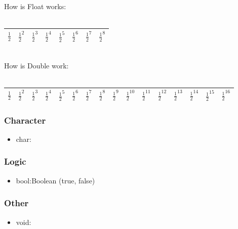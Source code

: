 \documentclass[a4paper]{article}
\begin{document}
\begin{remark}
How is Float works:\\
\\
\begin{tabular}{|c|c|c|c|c|c|c|c|}
\hline
 $\frac{1}{2}$&$ \frac{1}{2}^2$&$\frac{1}{2}^3 $&$\frac{1}{2}^4 $&$ \frac{1}{2}^5 $&$\frac{1}{2}^6 $&$\frac{1}{2}^7 $&$\frac{1}{2}^8$\\
\hline
\end{tabular}
\\
How is Double work:\\
\\
\begin{tabular}{|c|c|c|c|c|c|c|c|c|c|c|c|c|c|c|c|}
\hline
 $\frac{1}{2}$&$ \frac{1}{2}^2$&$\frac{1}{2}^3 $&$\frac{1}{2}^4 $&$ \frac{1}{2}^5 $&$\frac{1}{2}^6 $&$\frac{1}{2}^7 $&$\frac{1}{2}^8$&$\frac{1}{2}^9$&$ \frac{1}{2}^{10}$&$\frac{1}{2}^{11} $&$\frac{1}{2}^{12}$ & $\frac{1}{2}^{13}$ &$\frac{1}{2}^{14} $&$\frac{1}{2}^{15} $&$\frac{1}{2}^{16}$\\
\hline
\end{tabular}
\end{remark}
\begin{eg}


\end{eg}

\subsubsection{Character}

\begin{itemize}
\item char:
\end{itemize}

\subsubsection{Logic}

\begin{itemize}
\item bool:Boolean (true, false)
\end{itemize}

\subsubsection{Other}

\begin{itemize}
\item void:
\end{itemize}
\end{document}
